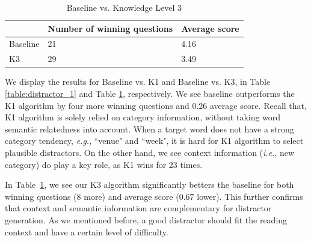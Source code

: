 \begin{table}[th]
    \caption{Baseline vs. Knowledge Level 3 }
    \label{table:distractor_2}
    \begin{center}
    \begin{tabular}{| p{1.5cm} | p{2.5cm} | p{2.2cm} |}
        \hline
         & Number of winning questions & Average score\\
        \hline
        Baseline & 21 & 4.16\\
        \hline
        K3 & 29 & 3.49\\
        \hline
    \end{tabular}
    \end{center}
\end{table}

We display the results for Baseline vs. K1 and Baseline vs. K3, in  
Table \ref{table:distractor_1} and Table \ref{table:distractor_2}, respectively.  We see baseline outperforms the K1 algorithm by four more winning questions and 0.26 average score. Recall that, K1 algorithm is solely relied on category information, without taking word semantic relatedness into account. When a target word does not have a strong category tendency, {\it e.g.}, ``venue" and ``week", it is hard for K1 algorithm to select plausible distractors. On the other hand, we see context information ({\it i.e.}, new category) do play a key role, as K1 wins for 23 times.


In Table~\ref{table:distractor_2}, we see our K3 algorithm significantly betters the baseline for both winning questions (8 more) and average score ($0.67$ lower). This further confirms that context and semantic information are complementary for distractor generation. As we mentioned before, a good distractor should fit the reading context and have a certain level of difficulty.
 
 




